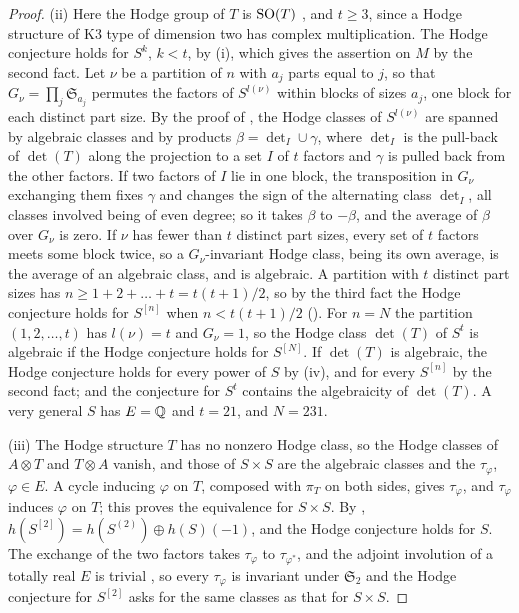 \begin{proof}
(ii) Here the Hodge group of $T$ is $\operatorname{SO}(T)$ \cite{Zar83}, and $t\ge3$,
since a Hodge structure of K3 type of dimension two has complex
multiplication. The Hodge conjecture holds for $S^{k}$, $k<t$, by
(i), which gives the assertion on $M$ by the second
fact. Let $\nu$ be a partition of $n$ with $a_{j}$ parts equal to $j$, so
that $G_{\nu}=\prod_{j}\mathfrak{S}_{a_{j}}$ permutes the factors of
$S^{l(\nu)}$ within blocks of sizes $a_{j}$, one block for each distinct part
size. By the proof of , the Hodge classes of
$S^{l(\nu)}$ are spanned by algebraic classes and by products
$\beta=\det_{I}\cup\gamma$, where $\det_{I}$ is the pull-back of $\det(T)$
along the projection to a set $I$ of $t$ factors and $\gamma$ is pulled back
from the other factors. If two factors of $I$ lie in one block, the
transposition in $G_{\nu}$ exchanging them fixes $\gamma$ and changes the
sign of the alternating class $\det_{I}$, all classes involved being of even
degree; so it takes $\beta$ to $-\beta$, and the average of $\beta$ over
$G_{\nu}$ is zero. If $\nu$ has fewer than $t$ distinct part sizes, every set
of $t$ factors meets some block twice, so a $G_{\nu}$-invariant Hodge class,
being its own average, is the average of an algebraic class, and is
algebraic. A partition with $t$ distinct part sizes has
$n\ge1+2+\dots+t=t(t+1)/2$, so by the third fact the Hodge conjecture holds
for $S^{[n]}$ when $n<t(t+1)/2$ (). For $n=N$ the
partition $(1,2,\dots,t)$ has
$l(\nu)=t$ and $G_{\nu}=1$, so the Hodge class $\det(T)$ of $S^{t}$ is
algebraic if the Hodge conjecture holds for $S^{[N]}$. If $\det(T)$ is
algebraic, the Hodge conjecture holds for every power of $S$ by
(iv), and for every $S^{[n]}$ by the second fact; and
the conjecture for $S^{t}$ contains the algebraicity of $\det(T)$. A very
general $S$ has $E=\mathbb{Q}$ and $t=21$, and $N=231$.

(iii) The Hodge structure $T$ has no nonzero Hodge class, so the Hodge
classes of $A\otimes T$ and $T\otimes A$ vanish, and those of $S\times S$
are the algebraic classes and the $\tau_{\varphi}$, $\varphi\in E$. A cycle
inducing $\varphi$ on $T$, composed with $\pi_{T}$ on both sides, gives
$\tau_{\varphi}$, and $\tau_{\varphi}$ induces $\varphi$ on $T$; this proves
the equivalence for $S\times S$. By \cite{dCM02},
$h(S^{[2]})=h(S^{(2)})\oplus h(S)(-1)$, and the Hodge conjecture holds for
$S$. The exchange of the two factors takes $\tau_{\varphi}$ to
$\tau_{\varphi^{*}}$, and the adjoint involution of a totally real $E$ is
trivial \cite{Zar83}, so every $\tau_{\varphi}$ is invariant under
$\mathfrak{S}_{2}$ and the Hodge conjecture for $S^{[2]}$ asks for the same
classes as that for $S\times S$.
\end{proof}

